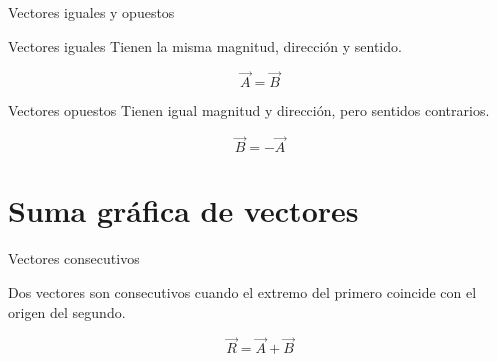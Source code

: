 \documentclass[aspectratio=169,11pt]{beamer}
\newcommand{\form}[1]{
 \[
 \boxed{#1}
 \]
}
\begin{document}
\begin{frame}{Vectores iguales y opuestos}

\begin{block}{Vectores iguales}
Tienen la misma magnitud,
dirección y sentido.
\end{block}

\[
\vec A=\vec B
\]

\begin{block}{Vectores opuestos}
Tienen igual magnitud y dirección,
pero sentidos contrarios.
\end{block}

\[
\vec B=-\vec A
\]

\begin{center}
\end{center}

\end{frame}

\section{Suma gráfica de vectores}

\begin{frame}{Vectores consecutivos}

Dos vectores son consecutivos
cuando el extremo del primero
coincide con el origen del segundo.

\begin{center}
\end{center}

\form{\vec R=\vec A+\vec B}

\end{frame}
\end{document}
